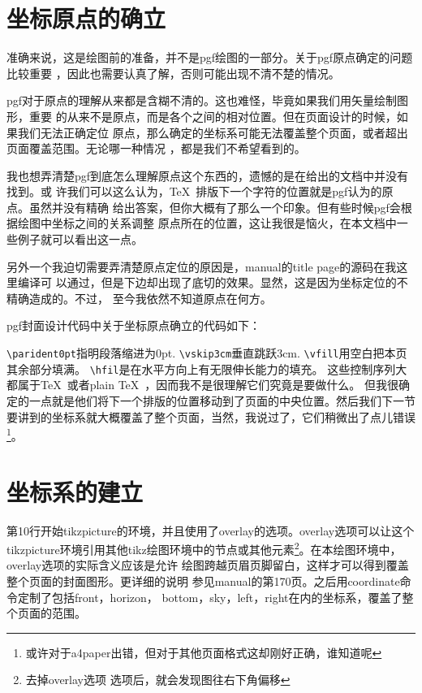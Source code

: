 \documentclass[10pt,a4paper,titlepage]{article}
\begin{document}
\setcounter{page}{1}
\pagestyle{fancy}

\section{坐标原点的确立}
准确来说，这是绘图前的准备，并不是pgf绘图的一部分。关于pgf原点确定的问题比较重要
，因此也需要认真了解，否则可能出现不清不楚的情况。

pgf对于原点的理解从来都是含糊不清的。这也难怪，毕竟如果我们用矢量绘制图形，重要
的从来不是原点，而是各个之间的相对位置。但在页面设计的时候，如果我们无法正确定位
原点，那么确定的坐标系可能无法覆盖整个页面，或者超出页面覆盖范围。无论哪一种情况
，都是我们不希望看到的。

我也想弄清楚pgf到底怎么理解原点这个东西的，遗憾的是在给出的文档中并没有找到。或
许我们可以这么认为，\TeX\ 排版下一个字符的位置就是pgf认为的原点。虽然并没有精确
给出答案，但你大概有了那么一个印象。但有些时候pgf会根据绘图中坐标之间的关系调整
原点所在的位置，这让我很是恼火，在本文档中一些例子就可以看出这一点。

另外一个我迫切需要弄清楚原点定位的原因是，manual的title page的源码在我这里编译可
以通过，但是下边却出现了底切的效果。显然，这是因为坐标定位的不精确造成的。不过，
至今我依然不知道原点在何方。

\vspace{3ex}

pgf封面设计代码中关于坐标原点确立的代码如下：



\Verb|\parident0pt|指明段落缩进为0pt.
\Verb|\vskip3cm|垂直跳跃3cm.
\Verb|\vfill|用空白把本页其余部分填满。
\Verb|\hfil|是在水平方向上有无限伸长能力的填充。
这些控制序列大都属于\TeX\ 或者plain \TeX\ ，因而我不是很理解它们究竟是要做什么。
但我很确定的一点就是他们将下一个排版的位置移动到了页面的中央位置。然后我们下一节
要讲到的坐标系就大概覆盖了整个页面，当然，我说过了，它们稍微出了点儿错误
\footnote{或许对于a4paper出错，但对于其他页面格式这却刚好正确，谁知道呢}。

\section{坐标系的建立}


第10行开始tikzpicture的环境，并且使用了overlay的选项。overlay选项可以让这个
tikzpicture环境引用其他tikz绘图环境中的节点或其他元素\footnote{去掉overlay选项
选项后，就会发现图往右下角偏移}。在本绘图环境中，overlay选项的实际含义应该是允许
绘图跨越页眉页脚留白，这样才可以得到覆盖整个页面的封面图形。更详细的说明
参见manual的第170页。之后用coordinate命令定制了包括front，horizon，
bottom，sky，left，right在内的坐标系，覆盖了整个页面的范围。
\end{document}

